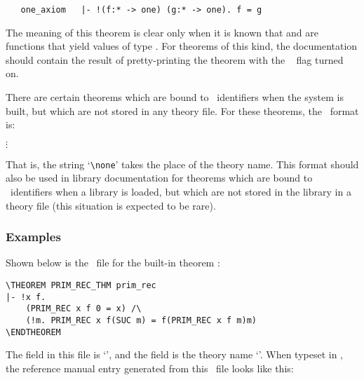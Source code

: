 \begin{hol}\begin{verbatim}
   one_axiom   |- !(f:* -> one) (g:* -> one). f = g
\end{verbatim}\end{hol}

\noindent The meaning of this theorem is clear only when it is known that
 and  are functions that yield values of type .  For
theorems of this kind, the documentation should contain the result of
pretty-printing the theorem with the \ML\  flag turned on.

There are certain theorems which  are bound to \ML\ identifiers when the
system is built, but which are not stored in any theory file.  For these
theorems, the \doc\ format is:

\smallskip

\begin{boxed}\begin{alltt}
\vsp{}\vsp{}
\(\vdots\)
\end{alltt}\end{boxed}

\smallskip

\noindent That is, the string `{\small\verb!\none!}' takes the place of the
theory name. This format should also be used in library documentation for
theorems which are bound to \ML\ identifiers when a library is loaded, but
which are not stored in the library in a theory file (this situation is
expected to be rare).

\subsubsection{Examples}

Shown below is the \doc\ file for the built-in theorem :

\smallskip

\begin{boxed}\begin{verbatim}
\THEOREM PRIM_REC_THM prim_rec
|- !x f.
    (PRIM_REC x f 0 = x) /\
    (!m. PRIM_REC x f(SUC m) = f(PRIM_REC x f m)m)
\ENDTHEOREM
\end{verbatim}\end{boxed}

\smallskip

\noindent The  field in this file is  `',
and the \meta{thyname} field is the theory name `\ml{prim\_rec}'. When
typeset in \latex, the reference manual entry generated from this \doc\ file
looks like this:

